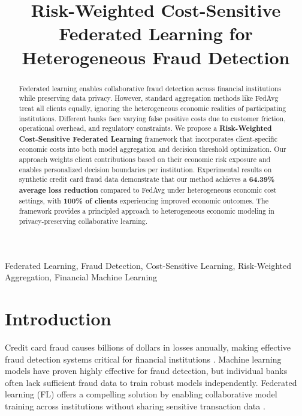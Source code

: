 \documentclass[conference]{IEEEtran}
\begin{document}
\title{Risk-Weighted Cost-Sensitive Federated Learning for Heterogeneous Fraud Detection\\
{\footnotesize \textsuperscript{}}
}

\author{
}

\maketitle

\begin{abstract}
Federated learning enables collaborative fraud detection across financial institutions while preserving data privacy. However, standard aggregation methods like FedAvg treat all clients equally, ignoring the heterogeneous economic realities of participating institutions. Different banks face varying false positive costs due to customer friction, operational overhead, and regulatory constraints. We propose a \textbf{Risk-Weighted Cost-Sensitive Federated Learning} framework that incorporates client-specific economic costs into both model aggregation and decision threshold optimization. Our approach weights client contributions based on their economic risk exposure and enables personalized decision boundaries per institution. Experimental results on synthetic credit card fraud data demonstrate that our method achieves a \textbf{64.39\% average loss reduction} compared to FedAvg under heterogeneous economic cost settings, with \textbf{100\% of clients} experiencing improved economic outcomes. The framework provides a principled approach to heterogeneous economic modeling in privacy-preserving collaborative learning.
\end{abstract}

\begin{IEEEkeywords}
Federated Learning, Fraud Detection, Cost-Sensitive Learning, Risk-Weighted Aggregation, Financial Machine Learning
\end{IEEEkeywords}

\section{Introduction}
\label{sec:introduction}

Credit card fraud causes billions of dollars in losses annually, making effective fraud detection systems critical for financial institutions \cite{dal2017credit}. Machine learning models have proven highly effective for fraud detection, but individual banks often lack sufficient fraud data to train robust models independently. Federated learning (FL) offers a compelling solution by enabling collaborative model training across institutions without sharing sensitive transaction data \cite{mcmahan2017communication}.
\end{document}
